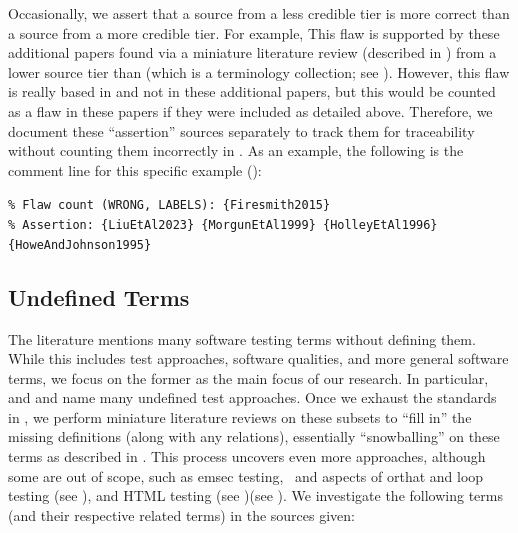     \label{less-cred-assert}
    Occasionally, we assert that a source from a less credible tier is more
    correct than a source from a more credible tier.
    For example, \tolTestFlaw*{} This flaw is supported by these additional
    papers found via a miniature literature review (described in
    ) from a lower source tier than \citet{Firesmith2015}
    (which is a terminology collection; see ). However,
    this flaw is really based in \citet{Firesmith2015} and not in these
    additional papers, but this would be counted as a flaw in these papers if
    they were included as detailed above. Therefore, we document these
    ``assertion'' sources separately to track them for traceability without
    counting them incorrectly in . As an example, the
    following is the comment line\utd{} for this specific example
    ():
    \begin{displayquote}
        \texttt{\% Flaw count (WRONG, LABELS): \{Firesmith2015\}\\
            \% Assertion: \{LiuEtAl2023\} \{MorgunEtAl1999\} \{HolleyEtAl1996\}
            \displayNL \{HoweAndJohnson1995\}}
    \end{displayquote}
\fi

\subsection{Undefined Terms}\label{undef-terms}

The literature mentions many software testing terms without defining them.
While this includes test approaches, software qualities, and more general
software terms, we focus on the former as the main focus of our research.
In particular, \ifnotpaper \citet{IEEE2022} and \citet{Firesmith2015} \else
    \cite{Firesmith2015} and \cite{IEEE2022} \fi name many undefined test
approaches. Once we exhaust the standards in , we
perform miniature literature reviews on these subsets to ``fill in'' the
missing definitions (along with any relations), essentially ``snowballing''
on these terms as described in . This process uncovers
even more approaches, although some are
out of scope, such as \acf{emsec} testing\ifnotpaper, \else\ and \fi
aspects of \acf{orthat} \ifnotpaper and loop testing (see ),
    and HTML testing (see )\else (see )\fi.
We investigate the following terms (and their respective related terms) in the
sources given:



